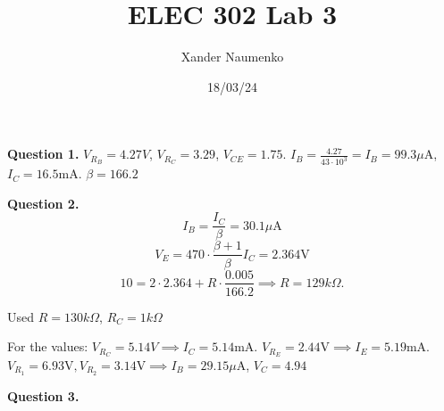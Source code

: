 \documentclass[letterpaper, reqno,11pt]{article}
\begin{document}
\title{ELEC 302 Lab 3}
\date{18/03/24}
\author{Xander Naumenko}
\maketitle

{\medskip\noindent\bf Question 1.} $V_{R_B}=4.27V$, $V_{R_C}=3.29$, $V_{CE}=1.75$. $I_B=\frac{4.27}{43\cdot 10^{3}}=I_B=99.3\mu$A, $I_C=16.5$mA. $\beta=166.2$

{\medskip\noindent\bf Question 2.} 
\[
I_B=\frac{I_C}{\beta}=30.1\mu\text{A}
\]
\[
V_E=470\cdot \frac{\beta+1}{\beta} I_C=2.364\text{V}
\]
\[
10=2\cdot 2.364+R\cdot \frac{0.005}{166.2}\implies R=129k\Omega
.\]

Used $R=130k\Omega$, $R_C=1k\Omega$

For the values: $V_{R_C}=5.14V\implies I_C=5.14$mA. $V_{R_E}=2.44\text{V}\implies I_E=5.19$mA. $V_{R_1}=6.93\text{V}, V_{R_2}=3.14\text{V}\implies I_B=29.15\mu$A, $V_C=4.94$

{\medskip\noindent\bf Question 3.} 
\end{document}
